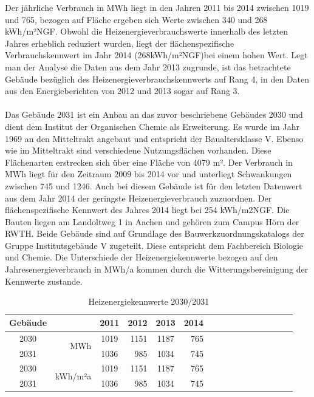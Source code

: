 Der jährliche Verbrauch in MWh liegt in den Jahren 2011 bis 2014 zwischen 1019 und 765, bezogen auf Fläche ergeben sich Werte zwischen 340 und 268 kWh/m²NGF. Obwohl die Heizenergieverbrauchswerte innerhalb des letzten Jahres erheblich reduziert wurden, liegt der flächenspezifische Verbrauchskennwert im Jahr 2014 (268kWh/m²NGF)bei einem hohen Wert. Legt man der Analyse die Daten aus dem Jahr 2013 zugrunde, ist das betrachtete Gebäude bezüglich des Heizenergieverbrauchskennwerts auf Rang 4, in den Daten aus den Energieberichten von 2012 und 2013 sogar auf Rang 3. \\
\\
Das Gebäude 2031 ist ein Anbau an das zuvor beschriebene Gebäudes 2030 und dient dem Institut der Organischen Chemie als Erweiterung. Es wurde im Jahr 1969 an den Mitteltrakt angebaut und entspricht der Baualtersklasse V. Ebenso wie im Mitteltrakt sind verschiedene Nutzungsflächen vorhanden. Diese Flächenarten erstrecken sich über eine Fläche von 4079 m². Der Verbrauch in MWh liegt für den Zeitraum 2009 bis 2014 vor und unterliegt Schwankungen zwischen 745 und 1246. Auch bei diesem Gebäude ist für den letzten Datenwert aus dem Jahr 2014 der geringste Heizenergieverbrauch zuzuordnen. Der flächenspezifische Kennwert des Jahres 2014 liegt bei 254 kWh/m2NGF. 
Die Bauten liegen am Landoltweg 1 in Aachen und gehören zum Campus Hörn der RWTH. Beide Gebäude sind auf Grundlage des Bauwerkzuordnungskatalogs der Gruppe Institutsgebäude V zugeteilt. Diese entspricht dem Fachbereich Biologie und Chemie. 
Die Unterschiede der Heizenergiekennwerte bezogen auf den Jahresenergieverbrauch in MWh/a kommen durch die Witterungsbereinigung der Kennwerte zustande.

\begin{table}[htb]
\centering
\caption{Heizenergiekennwerte 2030/2031 }\vspace{6pt}
\label{fig:Heizenergiewerte}
\begin{tabular}{crcrcrcrcrcrcrcr} 
\hline
\textbf{Gebäude} & & \textbf{2011} & \textbf{2012} & \textbf{2013} & \textbf{2014} \\

\hline 
2030 & \multirow{2}{14mm}{MWh} & 1019 & 1151 & 1187 & 765 \\ 
2031 &  & 1036 & 985 & 1034 & 745 \\ 
2030 & \multirow{2}{14mm}{kWh/m²a} & 1019 & 1151 & 1187 & 765  \\ 
2031 &   & 1036 & 985 & 1034 & 745  \\
\hline 
\end{tabular}
\label{tab:Tabelle}
\end{table}

